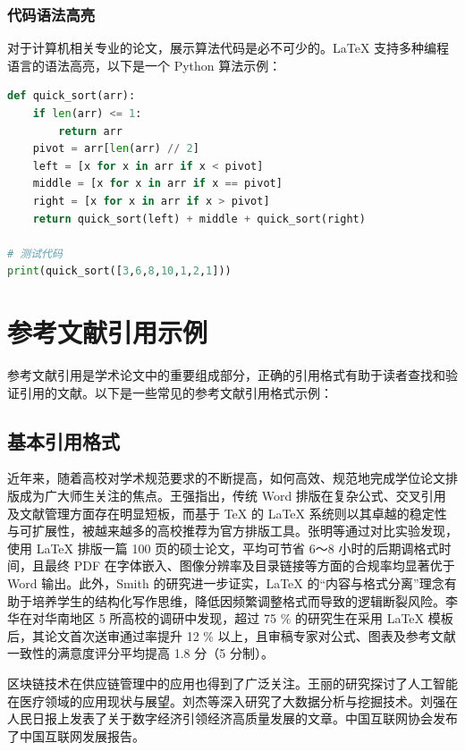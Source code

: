 \documentclass[UTF8,AutoFakeBold=1,AutoFakeSlant,zihao=-4]{SCAU}
\begin{document}
\subsubsection{代码语法高亮}
对于计算机相关专业的论文，展示算法代码是必不可少的。LaTeX 支持多种编程语言的语法高亮，以下是一个 Python 算法示例：

\begin{lstlisting}[language=Python, caption={快速排序算法 (Python 实现)}]
def quick_sort(arr):
    if len(arr) <= 1:
        return arr
    pivot = arr[len(arr) // 2]
    left = [x for x in arr if x < pivot]
    middle = [x for x in arr if x == pivot]
    right = [x for x in arr if x > pivot]
    return quick_sort(left) + middle + quick_sort(right)

# 测试代码
print(quick_sort([3,6,8,10,1,2,1]))
\end{lstlisting}
\section{参考文献引用示例}

参考文献引用是学术论文中的重要组成部分，正确的引用格式有助于读者查找和验证引用的文献。以下是一些常见的参考文献引用格式示例：

\subsection{基本引用格式}

近年来，随着高校对学术规范要求的不断提高，如何高效、规范地完成学位论文排版成为广大师生关注的焦点\cite{王强2020}。王强指出，传统 Word 排版在复杂公式、交叉引用及文献管理方面存在明显短板，而基于 TeX 的 LaTeX 系统则以其卓越的稳定性与可扩展性，被越来越多的高校推荐为官方排版工具\cite{张明2023}。张明等通过对比实验发现，使用 LaTeX 排版一篇 100 页的硕士论文，平均可节省 6～8 小时的后期调格式时间，且最终 PDF 在字体嵌入、图像分辨率及目录链接等方面的合规率均显著优于 Word 输出\cite{Smith2021}。此外，Smith 的研究进一步证实，LaTeX 的“内容与格式分离”理念有助于培养学生的结构化写作思维，降低因频繁调整格式而导致的逻辑断裂风险\cite{李华2021}。李华在对华南地区 5 所高校的调研中发现，超过 75 \% 的研究生在采用 LaTeX 模板后，其论文首次送审通过率提升 12 \% 以上，且审稿专家对公式、图表及参考文献一致性的满意度评分平均提高 1.8 分（5 分制）\cite{陈静2021}。

区块链技术在供应链管理中的应用也得到了广泛关注\cite{赵亮2022}。王丽的研究探讨了人工智能在医疗领域的应用现状与展望\cite{王丽2019}。刘杰等深入研究了大数据分析与挖掘技术\cite{刘杰2020}。刘强在人民日报上发表了关于数字经济引领经济高质量发展的文章\cite{刘强2023}。中国互联网协会发布了中国互联网发展报告\cite{中国互联网协会2022}。
\end{document}
